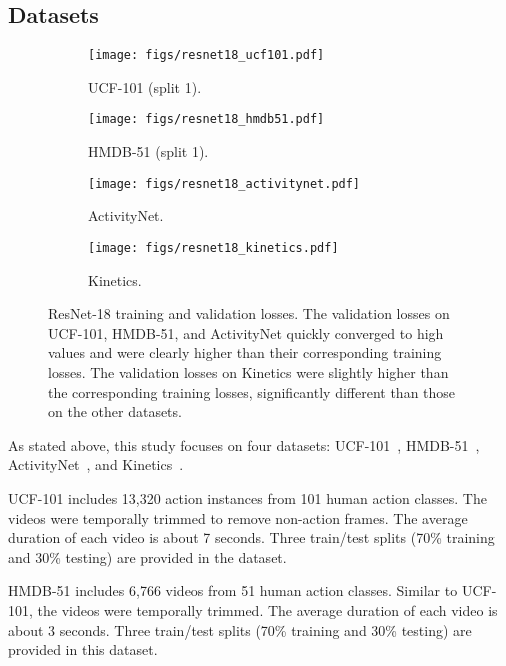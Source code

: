 \documentclass[10pt,twocolumn,letterpaper]{article}
\begin{document}
  \subsection{Datasets}
    \begin{figure*}[t]
      \begin{subfigure}[b]{0.2475\linewidth}
        \texttt{[image: figs/resnet18\_ucf101.pdf]}
        \caption{UCF-101 (split 1).}\label{fig:resnet18_ucf101}
      \end{subfigure}
      \begin{subfigure}[b]{0.2475\linewidth}
        \texttt{[image: figs/resnet18\_hmdb51.pdf]}
        \caption{HMDB-51 (split 1).}\label{fig:resnet18_hmdb51}
      \end{subfigure}
      \begin{subfigure}[b]{0.2475\linewidth}
        \texttt{[image: figs/resnet18\_activitynet.pdf]}
        \caption{ActivityNet.}\label{fig:resnet18_activitynet}
      \end{subfigure}
      \begin{subfigure}[b]{0.2475\linewidth}
        \texttt{[image: figs/resnet18\_kinetics.pdf]}
        \caption{Kinetics.}\label{fig:resnet18_kinetics}
      \end{subfigure}
      \caption{
        ResNet-18 training and validation losses.
        The validation losses on UCF-101, HMDB-51, and ActivityNet quickly converged to high values
        and were clearly higher than their corresponding training losses.
        The validation losses on Kinetics were slightly higher than the corresponding training losses,
        significantly different than those on the other datasets.
      }\label{fig:resnet18}
    \end{figure*}
    As stated above, this study focuses on four datasets:
    UCF-101~\cite{UCF101}, HMDB-51~\cite{HMDB51}, ActivityNet~\cite{activitynet}, and Kinetics~\cite{Kinetics}.

    UCF-101 includes 13,320 action instances from 101 human action classes.
    The videos were temporally trimmed to remove non-action frames.
    The average duration of each video is about 7 seconds.
    Three train/test splits (70\% training and 30\% testing) are provided in the dataset.

    HMDB-51 includes 6,766 videos from 51 human action classes.
    Similar to UCF-101, the videos were temporally trimmed.
    The average duration of each video is about 3 seconds.
    Three train/test splits (70\% training and 30\% testing) are provided in this dataset.
\end{document}
